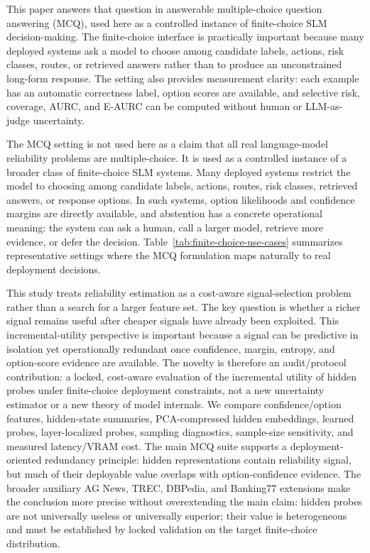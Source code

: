 \documentclass[preprint,12pt,authoryear]{elsarticle}
\begin{document}
This paper answers that question in answerable multiple-choice question answering (MCQ), used here as a controlled instance of finite-choice SLM decision-making. The finite-choice interface is practically important because many deployed systems ask a model to choose among candidate labels, actions, risk classes, routes, or retrieved answers rather than to produce an unconstrained long-form response. The setting also provides measurement clarity: each example has an automatic correctness label, option scores are available, and selective risk, coverage, AURC, and E-AURC can be computed without human or LLM-as-judge uncertainty.

The MCQ setting is not used here as a claim that all real language-model reliability problems are multiple-choice. It is used as a controlled instance of a broader class of finite-choice SLM systems. Many deployed systems restrict the model to choosing among candidate labels, actions, routes, risk classes, retrieved answers, or response options. In such systems, option likelihoods and confidence margins are directly available, and abstention has a concrete operational meaning: the system can ask a human, call a larger model, retrieve more evidence, or defer the decision. Table~\ref{tab:finite-choice-use-cases} summarizes representative settings where the MCQ formulation maps naturally to real deployment decisions.

This study treats reliability estimation as a cost-aware signal-selection problem rather than a search for a larger feature set. The key question is whether a richer signal remains useful after cheaper signals have already been exploited. This incremental-utility perspective is important because a signal can be predictive in isolation yet operationally redundant once confidence, margin, entropy, and option-score evidence are available. The novelty is therefore an audit/protocol contribution: a locked, cost-aware evaluation of the incremental utility of hidden probes under finite-choice deployment constraints, not a new uncertainty estimator or a new theory of model internals. We compare confidence/option features, hidden-state summaries, PCA-compressed hidden embeddings, learned probes, layer-localized probes, sampling diagnostics, sample-size sensitivity, and measured latency/VRAM cost. The main MCQ suite supports a deployment-oriented redundancy principle: hidden representations contain reliability signal, but much of their deployable value overlaps with option-confidence evidence. The broader auxiliary AG News, TREC, DBPedia, and Banking77 extensions make the conclusion more precise without overextending the main claim: hidden probes are not universally useless or universally superior; their value is heterogeneous and must be established by locked validation on the target finite-choice distribution.
\end{document}
